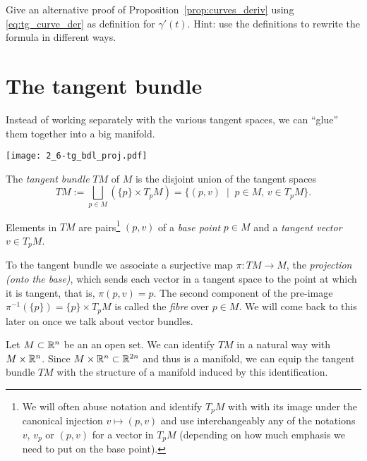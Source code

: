 \begin{exe}
    Give an alternative proof of Proposition~\ref{prop:curves_deriv} using \eqref{eq:tg_curve_der} as definition for $\gamma'(t)$.
    Hint: use the definitions to rewrite the formula in different ways.
\end{exe}

\section{The tangent bundle}

Instead of working separately with the various tangent spaces, we can ``glue'' them together into a big manifold.

\begin{marginfigure}
    \texttt{[image: 2\_6-tg\_bdl\_proj.pdf]}
\end{marginfigure}
\begin{defn}
    The \emph{tangent bundle} $TM$ of $M$ is the disjoint union of the tangent spaces
    \begin{equation}
        TM := \bigsqcup_{p\in M}\left(\{p\}\times T_pM\right)
           = \{(p,v) \;\mid\; p\in M,\, v\in T_pM\}.
    \end{equation}    
\end{defn}

Elements in $TM$ are pairs\footnote{We will often abuse notation and identify $T_pM$ with with its image under the canonical injection $v\mapsto(p,v)$ and use interchangeably any of the notations $v$, $v_p$ or $(p,v)$ for a vector in $T_pM$ (depending on how much emphasis we need to put on the base point).} $(p,v)$ of a \emph{base point} $p\in M$ and a \emph{tangent vector} $v\in T_pM$.

To the tangent bundle we associate a surjective map $\pi:TM \to M$, the \emph{projection (onto the base)}, which sends each vector in a tangent space to the point at which it is tangent, that is, $\pi(p,v) = p$.
The second component of the pre-image $\pi^{-1}(\{p\}) = \{p\}\times T_pM$ is called the \emph{fibre} over $p\in M$.
We will come back to this later on once we talk about vector bundles.

\begin{ex}
    Let $M\subset \mathbb{R}^n$ be an an open set.
    We can identify $TM$ in a natural way with $M\times\mathbb{R}^n$.
    Since $M\times\mathbb{R}^n \subset \mathbb{R}^{2n}$ and thus is a manifold, we can equip the tangent bundle $TM$ with the structure of a manifold induced by this identification.
\end{ex}

